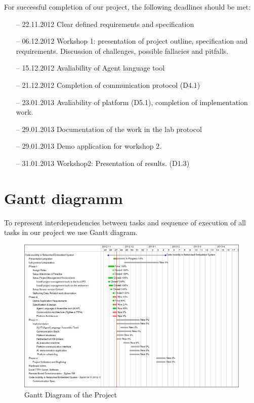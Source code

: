 \documentclass{scrreprt}
\begin{document}
For successful completion of our project, the following deadlines should be met:
\begin{itemize}

\item[--] 22.11.2012 Clear defined requirements and specification
\item[--]{ 06.12.2012 Workshop 1: presentation of project outline, specification and requirements.
	Discussion of challenges, possible fallacies and pitfalls.}
\item[--] 15.12.2012 Avaliability of Agent language tool
\item[--] 21.12.2012 Completion of communication protocol (D4.1)
\item[--] 23.01.2013 Avaliability of platform (D5.1), completion of implementation work.
\item[--] 29.01.2013 Documentation of the work in the lab protocol
\item[--] 29.01.2013 Demo application for workshop 2.
\item[--] 31.01.2013 Workshop2: Presentation of results. (D1.3)
\end{itemize}

	\section{Gantt diagramm}

To represent interdependencies between tasks and sequence of execution of all tasks in our project we use Gantt diagram.

\begin{figure}[!htbp]
\centering
\includegraphics[scale=0.4]{figures/gantt.png}
\caption{Gantt Diagram of the Project}
\label{fig:ganttdiag}
\end{figure}
\end{document}
